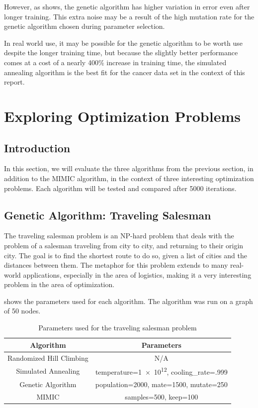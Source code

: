 \documentclass{article}
\begin{document}
      However, as  shows, the genetic algorithm has higher variation in error even after longer training. This extra noise may be a result of the high mutation rate for the genetic algorithm chosen during parameter selection.

      In real world use, it may be possible for the genetic algorithm to be worth use despite the longer training time, but because the slightly better performance comes at a cost of a nearly 400\% increase in training time, the simulated annealing algorithm is the best fit for the cancer data set in the context of this report.

  \section{Exploring Optimization Problems}

    \subsection{Introduction}
      In this section, we will evaluate the three algorithms from the previous section, in addition to the MIMIC algorithm, in the context of three interesting optimization problems. Each algorithm will be tested and compared after 5000 iterations.

    \subsection{Genetic Algorithm: Traveling Salesman}
      The traveling salesman problem is an NP-hard problem that deals with the problem of a salesman traveling from city to city, and returning to their origin city. The goal is to find the shortest route to do so, given a list of cities and the distances between them. The metaphor for this problem extends to many real-world applications, especially in the area of logistics, making it a very interesting problem in the area of optimization.

       shows the parameters used for each algorithm. The algorithm was run on a graph of 50 nodes.

      \begin{table}[h!]
      \centering
        \begin{tabular}{||c|c||}\hline
          \textbf{Algorithm} & \textbf{Parameters} \\ \hline
          Randomized Hill Climbing & N/A \\ \hline
          Simulated Annealing & temperature=\num{1e12}, cooling\_rate=.999 \\ \hline
          Genetic Algorithm & population=2000, mate=1500, mutate=250 \\ \hline
          MIMIC & samples=500, keep=100 \\ \hline
        \end{tabular}

        \caption{Parameters used for the traveling salesman problem}
        \label{tab:ts-params}
      \end{table}
\end{document}
